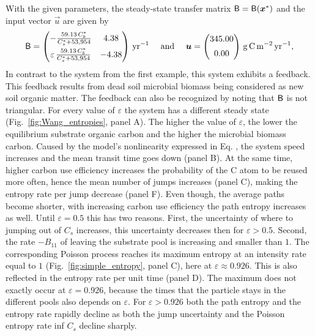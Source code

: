 \documentclass[smallextended]{svjour3}
\makeatletter
\renewcommand*{\eqref}[1]{%
  \hyperref[{#1}]{\textup{\tagform@{\ref*{#1}}}}%
}
\newcommand{\gC}{\mathrm{g\,C}}
\newcommand{\yr}{\mathrm{yr}}
\newcommand{\meter}{\mathrm{m}}
\makeatother
\begin{document}
With the given parameters, the steady-state transfer matrix $\tens{B}=\tens{B}(\vec{x}^\ast)$ and the input vector $\vec{u}$ are given by
\begin{equation*}
  \tens{B} = \begin{pmatrix}
    -\frac{59.13\,C^\ast_b}{C^\ast_s + 53,954} & 4.38\\[0.5em]
    \varepsilon\,\frac{59.13\,C^\ast_b}{C^\ast_s + 53,954} &  -4.38
  \end{pmatrix}\,\yr^{-1} \quad\text{ and }\quad \vec{u} = \begin{pmatrix}345.00\\[0.5em] 0.00\end{pmatrix}\,\gC\,\meter^{-2}\,\yr^{-1},
\end{equation*}
In contrast to the system from the first example, this system exhibits a feedback.
This feedback results from dead soil microbial biomass being considered as new soil organic matter.
The feedback can also be recognized by noting that $\mathsf{B}$ is not triangular.
For every value of $\varepsilon$ the system has a different steady state (Fig.~\ref{fig:Wang_entropies}, panel A).
The higher the value of $\varepsilon$, the lower the equilibrium substrate organic carbon and the higher the microbial biomass carbon.
Caused by the model's nonlinearity expressed in Eq. \eqref{eqn:lambdax}, the system speed increases and the mean transit time goes down (panel B).
At the same time, higher carbon use efficiency increases the probability of the C atom to be reused more often, hence the mean number of jumps increases (panel C), making the entropy rate per jump decrease (panel F).
Even though, the average paths become shorter, with increasing carbon use efficiency the path entropy increases as well.
Until $\varepsilon=0.5$ this has two reasons.
First, the uncertainty of where to jumping out of $C_s$ increases, this uncertainty decreases then for $\varepsilon>0.5$.
Second, the rate $-B_{11}$ of leaving the substrate pool is increasing and smaller than $1$.
The corresponding Poisson process reaches its maximum entropy at an intensity rate equal to $1$ (Fig.~\ref{fig:simple_entropy}, panel C), here at $\varepsilon\approx0.926$.
This is also reflected in the entropy rate per unit time (panel D).
The maximum does not exactly occur at $\varepsilon=0.926$, because the times that the particle stays in the different pools also depends on $\varepsilon$.
For $\varepsilon>0.926$ both the path entropy and the entropy rate rapidly decline as both the jump uncertainty and the Poisson entropy rate inf $C_s$ decline sharply.
\end{document}
